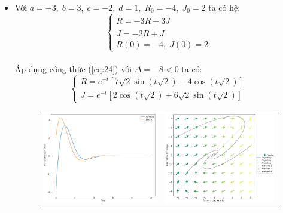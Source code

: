 \documentclass[a4paper]{article}
\begin{document}
\begin{enumerate}
    \begin{itemize}
    \item Với $a = -3,\;b = 3,\;c = -2,\;d = 1,\;R_0 = -4,\;J_0 = 2$ ta có hệ:
    $$\begin{cases} \dot{R}=-3R+3J \\ \dot{J}=-2R+J \\ R(0)=-4,\;J(0)=2 \end{cases}$$ \\
    Áp dụng công thức (\ref{eq:24}) với $\Delta = -8 < 0$ ta có:
    $$\begin{cases}
        R = e^{-t}\left[ 7\sqrt{2}\sin{\left( t\sqrt{2} \right)} - 4\cos{\left( t\sqrt{2} \right)}\right] \\[3pt]
        J = e^{-t}\left[ 2\cos{\left( t\sqrt{2} \right)} + 6\sqrt{2}\sin{\left( t\sqrt{2} \right)}\right]
    \end{cases}$$
    \begin{figure}[htp]
        \centering
        \begin{tabular}{cc}
            \includegraphics[scale = .33]{Images/Bt2/8.1_gr.png} &
            \includegraphics[scale = .33]{Images/Bt2/8.1_phase.png} \\

\end{tabular}
\end{figure}
\end{itemize}
\end{enumerate}
\end{document}
